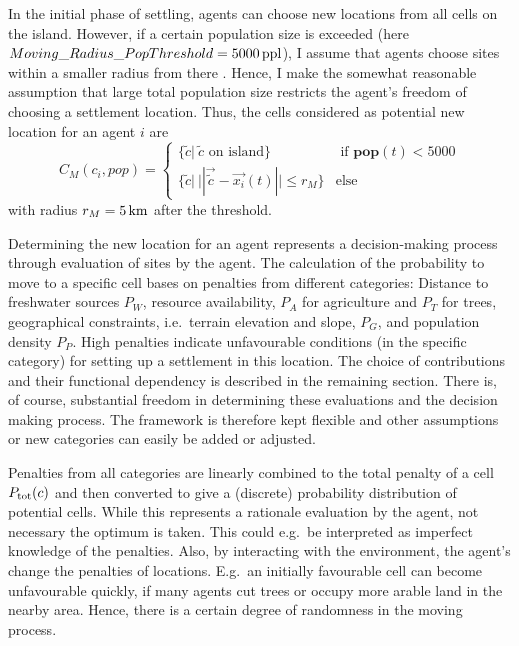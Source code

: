 In the initial phase of settling, agents can choose new locations from all cells on the island.
However, if a certain population size is exceeded (here $Moving\_Radius\_PopThreshold=5000 \, \rm{ppl}$), I assume that agents choose sites within a smaller radius from there .
Hence, I make the somewhat reasonable assumption that large total population size restricts the agent's freedom of choosing a settlement location.
Thus, the cells considered as potential new location for an agent $i$ are
\begin{equation}
C_{M}(c_i, pop) = 
\begin{cases}
\{\tilde{c} | \ \tilde{c}\text{ on island}\} & \text{ if } \mathbf{pop}(t) <5000 \\
\{\tilde{c} | \ | | \vec{\tilde{c}} - \vec{x_i}(t) | |
\leq r_{M} \} & \text{else} 
\end{cases}
\end{equation}
with radius $r_M = 5\, \rm{km}$ after the threshold.

Determining the new location for an agent represents a decision-making process through evaluation of sites by the agent.
The calculation of the probability to move to a specific cell bases on penalties from different categories: Distance to freshwater sources $P_W$, resource availability, $P_A$ for agriculture and $P_T$ for trees, geographical constraints, i.e.\ terrain elevation and slope, $P_G$, and population density $P_P$.
High penalties indicate unfavourable conditions (in the specific category) for setting up a settlement in this location.
The choice of contributions and their functional dependency is described in the remaining section.
There is, of course, substantial freedom in determining these evaluations and the decision making process.
The framework is therefore kept flexible and other assumptions or new categories can easily be added or adjusted.

Penalties from all categories are linearly combined to the total penalty of a cell $P_{\rm tot}(c)$ and then converted to give a (discrete) probability distribution of potential cells.
While this represents a rationale evaluation by the agent, not necessary the optimum is taken.
This could e.g.\ be interpreted as imperfect knowledge of the penalties. 
Also, by interacting with the environment, the agent's change the penalties of locations. 
E.g.\ an initially favourable cell can become unfavourable quickly, if many agents cut trees or occupy more arable land in the nearby area.  
Hence, there is a certain degree of randomness in the moving process. 

